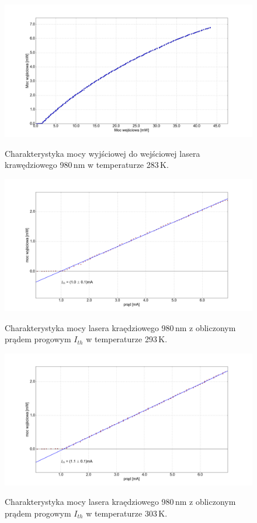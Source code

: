 \documentclass[a4paper, portrait,12pt]{report}
\begin{document}
\begin{figure}
\center
  \includegraphics[scale=0.30]{plot980/temp_10_power.png}
  \label{rys1}
  \caption{Charakterystyka mocy wyjściowej do wejściowej lasera krawędziowego 980\,nm w temperaturze 283\,K.} 
\end{figure}


\begin{figure}
\center
  \includegraphics[scale=0.30]{plot980/temp_20_fit.png}
  \label{rys1}
  \caption{Charakterystyka mocy lasera kraędziowego 980\,nm z obliczonym prądem progowym $I_{th}$ w temperaturze 293\,K.} 
\end{figure}

\begin{figure}
\center
  \includegraphics[scale=0.30]{plot980/temp_30_fit.png}
  \label{rys1}
  \caption{Charakterystyka mocy lasera kraędziowego 980\,nm z obliczonym prądem progowym $I_{th}$ w temperaturze 303\,K.} 
\end{figure}
\end{document}
